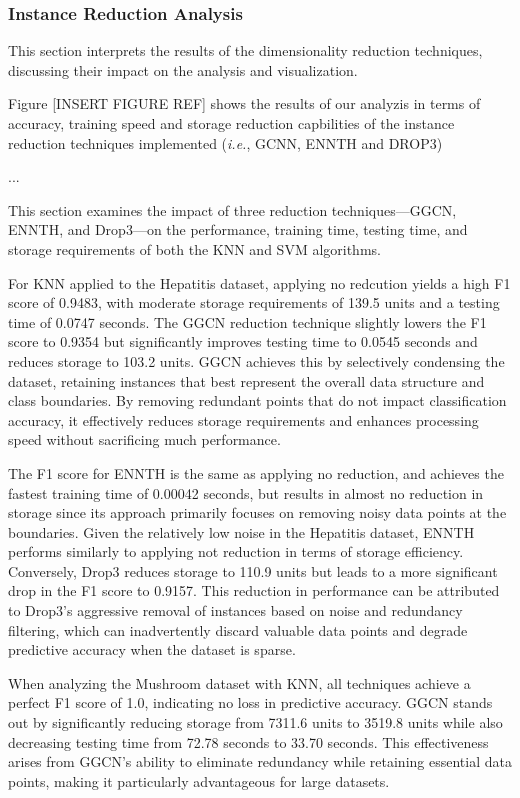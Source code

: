 \subsubsection{Instance Reduction Analysis}
\label{subsubsec:discussion-reduction}

This section interprets the results of the dimensionality reduction techniques, 
discussing their impact on the analysis and visualization.

Figure [INSERT FIGURE REF] shows the results of our analyzis in terms of accuracy, 
training speed and storage reduction capbilities of the instance reduction techniques
 implemented (\textit{i.e.}, GCNN, ENNTH and DROP3)

 ...

This section examines the impact of three reduction techniques—GGCN, ENNTH, and Drop3—on the performance, training time, testing time, and storage requirements of both the KNN and SVM algorithms.

For KNN applied to the Hepatitis dataset, applying no redcution yields a high F1 score of 0.9483, with moderate storage requirements of 139.5 units and a testing time of 0.0747 seconds. 
The GGCN reduction technique slightly lowers the F1 score to 0.9354 but significantly improves testing time to 0.0545 seconds and reduces storage to 103.2 units. 
GGCN achieves this by selectively condensing the dataset, retaining instances that best represent the overall data structure and class boundaries. 
By removing redundant points that do not impact classification accuracy, it effectively reduces storage requirements and enhances processing speed without sacrificing much performance.

The F1 score for ENNTH is the same as applying no reduction, and achieves the fastest training time of 0.00042 seconds, but results in almost no reduction in storage since its approach primarily focuses on removing noisy data points at the boundaries. 
Given the relatively low noise in the Hepatitis dataset, ENNTH performs similarly to applying not reduction in terms of storage efficiency. 
Conversely, Drop3 reduces storage to 110.9 units but leads to a more significant drop in the F1 score to 0.9157. 
This reduction in performance can be attributed to Drop3's aggressive removal of instances based on noise and redundancy filtering, which can inadvertently discard valuable data points and degrade predictive accuracy when the dataset is sparse.

When analyzing the Mushroom dataset with KNN, all techniques achieve a perfect F1 score of 1.0, indicating no loss in predictive accuracy. 
GGCN stands out by significantly reducing storage from 7311.6 units to 3519.8 units while also decreasing testing time from 72.78 seconds to 33.70 seconds. 
This effectiveness arises from GGCN's ability to eliminate redundancy while retaining essential data points, making it particularly advantageous for large datasets. 

